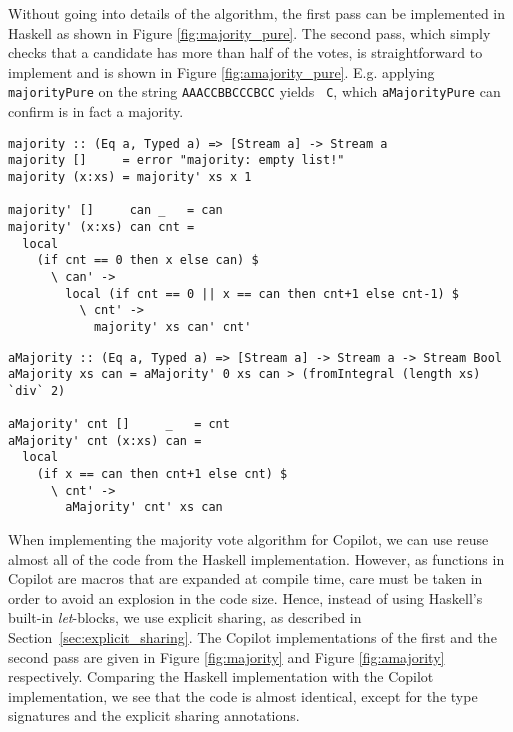 Without going into details of the algorithm, the first pass can be implemented
in Haskell as shown in Figure \ref{fig:majority_pure}. The second pass, which
simply checks that a candidate has more than half of the votes, is
straightforward to implement and is shown in Figure \ref{fig:amajority_pure}.
E.g. applying {\tt majorityPure} on the string {\tt AAACCBBCCCBCC} yields {\tt
  C}, which {\tt aMajorityPure} can confirm is in fact a majority.

\begin{figure*}[!htb]
\begin{lstlisting}[frame=none]
majority :: (Eq a, Typed a) => [Stream a] -> Stream a
majority []     = error "majority: empty list!"
majority (x:xs) = majority' xs x 1

majority' []     can _   = can
majority' (x:xs) can cnt =
  local
    (if cnt == 0 then x else can) $
      \ can' ->
        local (if cnt == 0 || x == can then cnt+1 else cnt-1) $
          \ cnt' ->
            majority' xs can' cnt'
\end{lstlisting}
\caption{The first pass of the majority vote algorithm in Copilot.}
\label{fig:majority}
\end{figure*}

\begin{figure*}[!htb]
\begin{lstlisting}[frame=none]
aMajority :: (Eq a, Typed a) => [Stream a] -> Stream a -> Stream Bool
aMajority xs can = aMajority' 0 xs can > (fromIntegral (length xs) `div` 2)

aMajority' cnt []     _   = cnt
aMajority' cnt (x:xs) can =
  local
    (if x == can then cnt+1 else cnt) $
      \ cnt' ->
        aMajority' cnt' xs can
\end{lstlisting}
\caption{The second pass of the majority vote algorithm in Copilot.}
\label{fig:amajority}
\end{figure*}

When implementing the majority vote algorithm for Copilot, we can use reuse
almost all of the code from the Haskell implementation. However, as functions
in Copilot are macros that are expanded at compile time, care must
be taken in order to avoid an explosion in the code size. Hence, instead of
using Haskell's built-in \emph{let}-blocks, we use explicit sharing, as
described in Section~\ref{sec:explicit_sharing}. The Copilot implementations
of the first and the second pass are given in Figure \ref{fig:majority} and
Figure \ref{fig:amajority} respectively. Comparing the Haskell implementation
with the Copilot implementation, we see that the code is almost identical,
except for the type signatures and the explicit sharing annotations.



